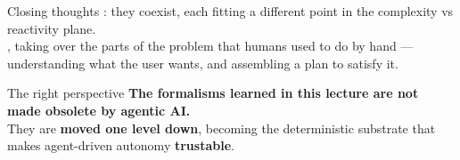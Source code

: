 \begin{frame}{Closing thoughts}
  \justifying
  : they coexist, each fitting a different point in the complexity vs reactivity plane.\\
  \bigskip
  , taking over the parts of the problem that humans used to do by hand --- understanding what the user wants, and assembling a plan to satisfy it.
  \bigskip
  \begin{block}{The right perspective}
    \justifying
    \textbf{The formalisms learned in this lecture are not made obsolete by agentic AI.}\\
    They are \textbf{moved one level down}, becoming the deterministic substrate that makes agent-driven autonomy \textbf{trustable}.
  \end{block}
\end{frame}
